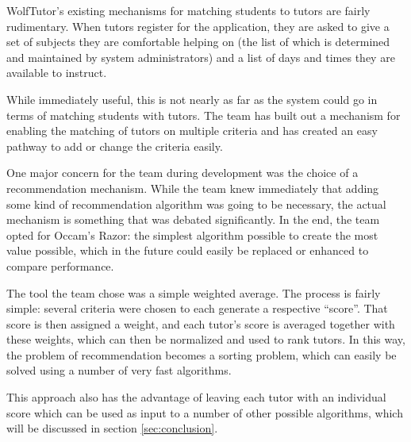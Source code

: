 WolfTutor's existing mechanisms for matching students to tutors are fairly
rudimentary.  When tutors register for the application, they are asked to give a
set of subjects they are comfortable helping on (the list of which is determined
and maintained by system administrators) and a list of days and times they are
available to instruct.  %

While immediately useful, this is not nearly as far as the system could go in
terms of matching students with tutors.  The team has built out a mechanism for
enabling the matching of tutors on multiple criteria and has created an easy
pathway to add or change the criteria easily.  

One major concern for the team during development was the choice of a
recommendation mechanism.  While the team knew immediately that adding some kind
of recommendation algorithm was going to be necessary, the actual mechanism is
something that was debated significantly.  In the end, the team opted for
Occam's Razor: the simplest algorithm possible to create the most value
possible, which in the future could easily be replaced or enhanced to compare
performance.

The tool the team chose was a simple weighted average.  The process is fairly
simple: several criteria were chosen to each generate a respective ``score''.
That score is then assigned a weight, and each tutor's score is averaged
together with these weights, which can then be normalized and used to rank
tutors. In this way, the problem of recommendation becomes a sorting problem,
which can easily be solved using a number of very fast algorithms.

This approach also has the advantage of leaving each tutor with an individual
score which can be used as input to a number of other possible algorithms, which
will be discussed in section \ref{sec:conclusion}.
